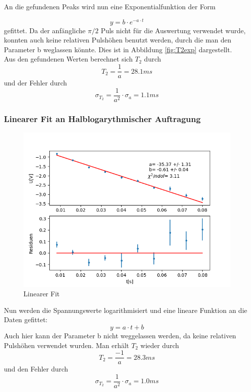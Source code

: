 \documentclass[12pt,a4paper]{article}
\begin{document}
An die gefundenen Peaks wird nun eine Exponentialfunktion der Form

\begin{equation}
y = b \cdot e^{-a\cdot t}
\end{equation}
gefittet. Da der anfängliche $\pi /2$ Puls nicht für die Auswertung verwendet wurde, konnten auch keine relativen Pulshöhen benutzt werden, durch die man den Parameter b weglassen könnte.
Dies ist in Abbildung \ref{fig:T2exp} dargestellt.\\
Aus den gefundenen Werten berechnet sich $T_2$ durch 
\begin{equation*}
T_2 = \dfrac{1}{a} = 28.1ms
\end{equation*}
und der Fehler durch
\begin{equation*}
\sigma_{T_2} = \dfrac{1}{a^2} \cdot \sigma_a = 1.1ms
\end{equation*}

\subsubsection{Linearer Fit an Halblogarythmischer Auftragung}

\begin{figure}
\centering
\includegraphics[scale=0.9]{Bilder/T2lin.png}
\caption{Linearer Fit}
\label{fig:T2lin}
\end{figure}

Nun werden die Spannungswerte logarithmisiert und eine lineare Funktion an die Daten gefittet:
\begin{equation}
y = a \cdot t + b
\end{equation}
Auch hier kann der Parameter b nicht weggelassen werden, da keine relativen Pulshöhen verwendet wurden.
Man erhält $T_2$ wieder durch 
\begin{equation*}
T_2 = \dfrac{-1}{a} = 28.3ms
\end{equation*}
und den Fehler durch
\begin{equation*}
\sigma_{T_2} = \dfrac{1}{a^2} \cdot \sigma_a = 1.0ms
\end{equation*}
\end{document}
